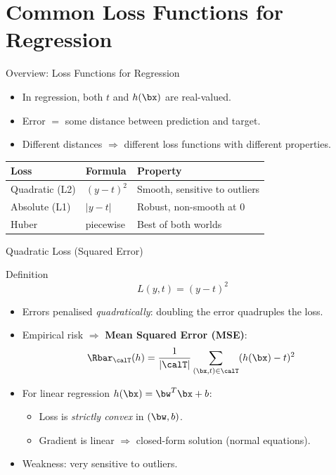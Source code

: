 \section{Common Loss Functions for Regression}

\begin{frame}{Overview: Loss Functions for Regression}
  \begin{itemize}
    \item In regression, both $t$ and $h(\bx)$ are real-valued.
    \item Error $=$ some distance between prediction and target.
    \item Different distances $\Rightarrow$ different loss functions with different properties.
  \end{itemize}
  \vspace{8pt}
  \begin{center}
  \renewcommand{\arraystretch}{1.4}
  \begin{tabular}{lll}
    \toprule
    \textbf{Loss} & \textbf{Formula} & \textbf{Property}\\
    \midrule
    Quadratic (L2) & $(y-t)^2$ & Smooth, sensitive to outliers\\
    Absolute (L1)  & $|y-t|$   & Robust, non-smooth at 0\\
    Huber          & piecewise  & Best of both worlds\\
    \bottomrule
  \end{tabular}
  \end{center}
\end{frame}

\begin{frame}{Quadratic Loss (Squared Error)}
  \begin{block}{Definition}
    \[ L(y,t) = (y-t)^2 \]
  \end{block}
  \begin{itemize}
    \item Errors penalised \emph{quadratically}: doubling the error quadruples the loss.
    \item Empirical risk $\Rightarrow$ \textbf{Mean Squared Error (MSE)}:
      \[
        \Rbar_{\calT}(h)
        = \frac{1}{|\calT|}\sum_{(\bx,t)\in\calT}(h(\bx)-t)^2
      \]
    \item For linear regression $h(\bx)=\bw^T\bx+b$:
      \begin{itemize}
        \item Loss is \emph{strictly convex} in $(\bw,b)$.
        \item Gradient is linear $\Rightarrow$ closed-form solution (normal equations).
      \end{itemize}
    \item \textcolor{AlertRed}{Weakness}: very sensitive to outliers.
  \end{itemize}
\end{frame}

